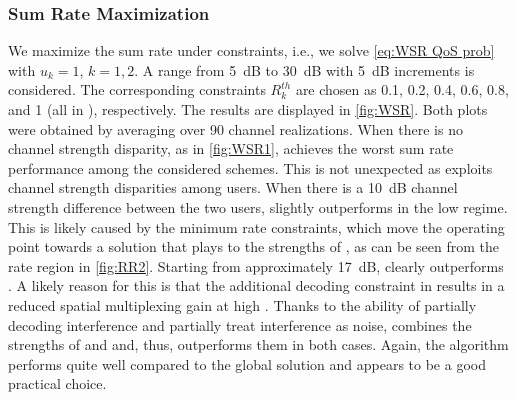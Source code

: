 \documentclass[a4paper,10pt,journal]{IEEEtran}
\begin{document}
\subsubsection{Sum Rate Maximization}
\label{sec:numeval:system:sr}

We maximize the sum rate under  constraints, i.e., we solve \cref{eq:WSR QoS prob} with $u_k = 1$, $k = 1, 2$. A  range from \SI{5}{\dB} to \SI{30}{\dB} with \SI{5}{\dB} increments is considered. The corresponding  constraints $R_k^{th}$ are chosen as 0.1, 0.2, 0.4, 0.6, 0.8, and 1 (all in \si{\bpcu}), respectively. The results are displayed in \cref{fig:WSR}. Both plots were obtained by averaging over 90  channel realizations. 
	When there is no channel strength disparity, as in \cref{fig:WSR1},  achieves the worst sum rate performance among the considered schemes. This is not unexpected as  exploits channel strength disparities among users.
	 When there is a \SI{10}{\dB} channel strength difference between the two users,  slightly outperforms  in the low  regime. This is likely caused by the minimum rate constraints, which move the operating point towards a solution that plays to the strengths of , as can be seen from the rate region in \cref{fig:RR2}.
%
	Starting from approximately \SI{17}{\dB},  clearly outperforms . A likely reason for this is that the additional decoding constraint in  results in a reduced spatial multiplexing gain at high  \cite{bruno2021MISONOMA}.
Thanks to the ability of partially decoding interference and partially treat interference as noise,  combines the strengths of  and  and, thus, outperforms them in both cases.
Again, the  algorithm performs quite well compared to the global solution and appears to be a good practical choice. %
\end{document}
